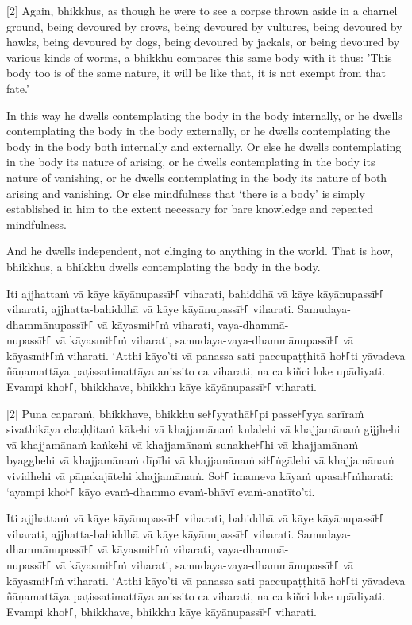 [2] Again, bhikkhus, as though he were to see a corpse thrown aside in a charnel
ground, being devoured by crows, being devoured by vultures, being devoured by
hawks, being devoured by dogs, being devoured by jackals, or being devoured by
various kinds of worms, a bhikkhu compares this same body with it thus: 'This
body too is of the same nature, it will be like that, it is not exempt from that
fate.'

In this way he dwells contemplating the body in the body internally, or he
dwells contemplating the body in the body externally, or he dwells contemplating
the body in the body both internally and externally. Or else he dwells
contemplating in the body its nature of arising, or he dwells contemplating in
the body its nature of vanishing, or he dwells contemplating in the body its
nature of both arising and vanishing. Or else mindfulness that ‘there is a body’
is simply established in him to the extent necessary for bare knowledge and
repeated mindfulness.

And he dwells independent, not clinging to anything in the world. That is how,
bhikkhus, a bhikkhu dwells contemplating the body in the body.

\paliPage

Iti ajjhattaṁ vā kāye kāyānupassī꜔꜒ viharati, bahiddhā vā kāye kāyānupassī꜔꜒
viharati, ajjhatta-bahiddhā vā kāye kāyānupassī꜔꜒ viharati. Samudaya-dhammānupassī꜔꜒
vā kāyasmi꜔꜒ṁ viharati, vaya-dhammā-\\
nupassī꜔꜒ vā kāyasmi꜔꜒ṁ viharati, samudaya-vaya-dhammānupassī꜔꜒ vā kāyasmi꜔꜒ṁ viharati.
‘Atthi kāyo’ti vā panassa sati paccupaṭṭhitā ho꜔꜒ti yāvadeva ñāṇamattāya
paṭissatimattāya anissito ca viharati, na ca kiñci loke upādiyati. Evampi kho꜔꜒,
bhikkhave, bhikkhu kāye kāyānupassī꜔꜒ viharati.

[2] Puna caparaṁ, bhikkhave, bhikkhu se꜔꜒yyathā꜔꜒pi passe꜔꜒yya sarīraṁ sivathikāya
chaḍḍitaṁ kākehi vā khajjamānaṁ kulalehi vā khajjamānaṁ gijjhehi vā khajjamānaṁ
kaṅkehi vā khajjamānaṁ sunakhe꜔꜒hi vā khajjamānaṁ byagghehi vā khajjamānaṁ dīpīhi
vā khajjamānaṁ si꜔꜒ṅgālehi vā khajjamānaṁ vividhehi vā pāṇakajātehi khajjamānaṁ.
So꜔꜒ imameva kāyaṁ upasa꜔꜒ṁharati: ‘ayampi kho꜔꜒ kāyo evaṁ-dhammo evaṁ-bhāvī
evaṁ-anatīto’ti.

Iti ajjhattaṁ vā kāye kāyānupassī꜔꜒ viharati, bahiddhā vā kāye kāyānupassī꜔꜒
viharati, ajjhatta-bahiddhā vā kāye kāyānupassī꜔꜒ viharati. Samudaya-dhammānupassī꜔꜒
vā kāyasmi꜔꜒ṁ viharati, vaya-dhammā-\\
nupassī꜔꜒ vā kāyasmi꜔꜒ṁ viharati, samudaya-vaya-dhammānupassī꜔꜒ vā kāyasmi꜔꜒ṁ viharati.
‘Atthi kāyo’ti vā panassa sati paccupaṭṭhitā ho꜔꜒ti yāvadeva ñāṇamattāya
paṭissatimattāya anissito ca viharati, na ca kiñci loke upādiyati. Evampi kho꜔꜒,
bhikkhave, bhikkhu kāye kāyānupassī꜔꜒ viharati.

